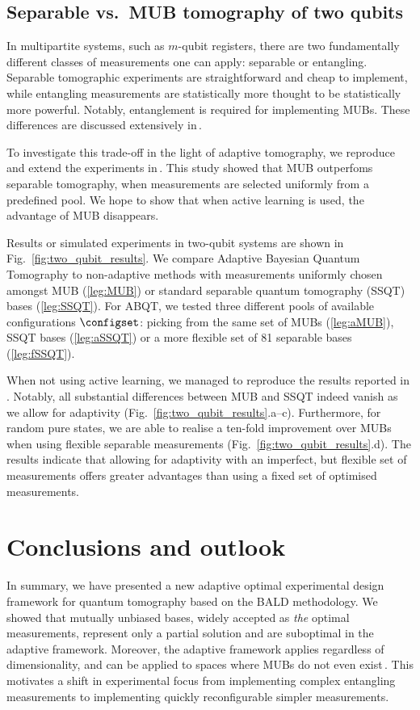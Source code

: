 \subsection{Separable vs.\ MUB tomography of two qubits}

In multipartite systems, such as $m$-qubit registers, there are two fundamentally different classes of measurements one can apply: separable or entangling. Separable tomographic experiments are straightforward and cheap to implement, while entangling measurements are statistically more thought to be statistically more powerful. Notably, entanglement is required for implementing MUBs. These differences are discussed extensively in\,\citep{MUBExperiment}.

To investigate this trade-off in the light of adaptive tomography, we reproduce and extend the experiments in\,\citep{MUBExperiment}. This study showed that MUB outperfoms separable tomography, when measurements are selected uniformly from a predefined pool. We hope to show that when active learning is used, the advantage of MUB disappears.

Results or simulated experiments in two-qubit systems are shown in Fig.\ \ref{fig:two_qubit_results}. We compare Adaptive Bayesian Quantum Tomography to non-adaptive methods with measurements uniformly chosen amongst MUB (\ref{leg:MUB}) or standard separable quantum tomography (SSQT) bases (\ref{leg:SSQT}). For ABQT, we tested three different pools of available configurations $\configset$: picking from the same set of MUBs (\ref{leg:aMUB}), SSQT bases (\ref{leg:aSSQT}) or a more flexible set of 81 separable bases (\ref{leg:fSSQT}).

When not using active learning, we managed to reproduce the results reported in \citep{MUBExperiment}. Notably, all substantial differences between MUB and SSQT indeed vanish as we allow for adaptivity (Fig.\ \ref{fig:two_qubit_results}.a--c). Furthermore, for random pure states, we are able to realise a ten-fold improvement over MUBs when using flexible separable measurements (Fig.\ \ref{fig:two_qubit_results}.d). The results indicate that allowing for adaptivity with an imperfect, but flexible set of measurements offers greater advantages than using a fixed set of optimised measurements.

\section{Conclusions and outlook}

In summary, we have presented a new adaptive optimal experimental design framework for quantum tomography based on the BALD methodology. We showed that mutually unbiased bases, widely accepted as \emph{the} optimal measurements, represent only a partial solution and are suboptimal in the adaptive framework. Moreover, the adaptive framework applies regardless of dimensionality, and can be applied to spaces where MUBs do not even exist\,\citep{DimensionSix,ExactInformation}. This motivates a shift in experimental focus from implementing complex entangling measurements to implementing quickly reconfigurable simpler measurements.
	
